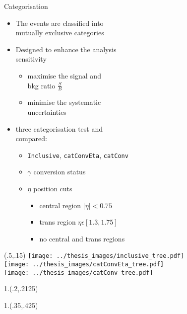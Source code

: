 \documentclass[10pt,UKenglish, leqno, xcolor = dvipsnames]{beamer}
\begin{document}
	\begin{frame}{Categorisation}
		\vfill
		\begin{itemize}
			\item The events are classified into\\ mutually exclusive categories
			\item Designed to enhance the analysis\\ sensitivity
			\begin{itemize}
				\item maximise the signal and\\ bkg ratio $\frac{S}{B}$
				\item minimise the systematic\\ uncertainties
			\end{itemize}
			\item three categorisation test and\\ compared:
			\begin{itemize}
				\item \texttt{Inclusive}, \texttt{catConvEta}, \texttt{catConv}
				\item $\gamma$ conversion status 
				\item $\eta$ position cuts
				\begin{itemize}
					\item central region $|\eta|<0.75$
					\item trans region $ \eta \epsilon [1.3,1.75]$
					\item no central and trans regions
				\end{itemize}
			\end{itemize}
		\end{itemize}
		\begin{textblock}{1}(.5,.15)
			\texttt{[image: ../thesis\_images/inclusive\_tree.pdf]}\\
			\texttt{[image: ../thesis\_images/catConvEta\_tree.pdf]}\\
			\texttt{[image: ../thesis\_images/catConv\_tree.pdf]}\\	
		\end{textblock}	
		\vfill
		\begin{textblock}{1.}(.2,.2125)
		\end{textblock}
		\begin{textblock}{1.}(.35,.425)

\end{textblock}
\end{frame}
\end{document}

